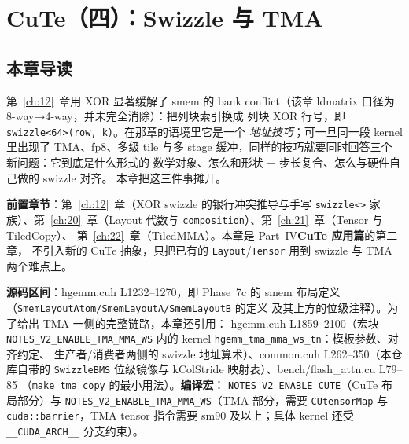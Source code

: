 \makeatletter
\providecommand{\urlchbrk}[1]{\@tfor\next:=#1\do{\next\allowbreak}}
\makeatother
\providecommand{\url}[1]{{\ttfamily\urlchbrk{#1}}}
\chapter{CuTe（四）：Swizzle 与 TMA}\label{ch:23}

\section{本章导读}

第~\ref{ch:12}~章用 XOR 显著缓解了 smem 的 bank conflict（该章 ldmatrix 口径为 8-way→4-way，并未完全消除）：把列块索引换成
列块 XOR 行号，即 \texttt{swizzle\allowbreak{}<64>\allowbreak{}(row,\allowbreak{} k)}。在那章的语境里它是一个
\emph{地址技巧}；可一旦同一段 kernel 里出现了 TMA、fp8、多级 tile 与多
stage 缓冲，同样的技巧就要同时回答三个新问题：它到底是什么形式的
数学对象、怎么和形状 $+$ 步长复合、怎么与硬件自己做的 swizzle 对齐。
本章把这三件事摊开。

\textbf{前置章节}：第~\ref{ch:12}~章（XOR swizzle 的银行冲突推导与手写
\texttt{swizzle<>} 家族）、第~\ref{ch:20}~章（Layout 代数与
\texttt{composition}）、第~\ref{ch:21}~章（Tensor 与 TiledCopy）、
第~\ref{ch:22}~章（TiledMMA）。本章是 Part~IV\textbf{CuTe 应用篇}的第二章，
不引入新的 CuTe 抽象，只把已有的 \texttt{Layout}/\texttt{Tensor} 用到
swizzle 与 TMA 两个难点上。

\textbf{源码区间}：hgemm.cuh L1232--1270，即 Phase~7c 的 smem 布局定义
（\texttt{Smem\allowbreak{}Layout\allowbreak{}Atom/\allowbreak{}SmemLayoutA/\allowbreak{}SmemLayoutB} 的定义
及其上方的位级注释）。为了给出 TMA 一侧的完整链路，本章还引用：
hgemm.cuh L1859--2100（宏块 \texttt{NOTES\_\allowbreak{}V2\_\allowbreak{}ENABLE\_\allowbreak{}TMA\_\allowbreak{}MMA\_\allowbreak{}WS}
内的 kernel \texttt{hgemm\_\allowbreak{}tma\_\allowbreak{}mma\_\allowbreak{}ws\_\allowbreak{}tn}：模板参数、对齐约定、
生产者/消费者两侧的 swizzle 地址算术）、common.cuh L262--350（本仓库自带的
\texttt{SwizzleBMS} 位级镜像与 kColStride 映射表）、bench/flash\_attn.cu L79--85
（\texttt{make\_\allowbreak{}tma\_\allowbreak{}copy} 的最小用法）。\textbf{编译宏}：
\texttt{NOTES\_\allowbreak{}V2\_\allowbreak{}ENABLE\_\allowbreak{}CUTE}（CuTe 布局部分）与
\texttt{NOTES\_\allowbreak{}V2\_\allowbreak{}ENABLE\_\allowbreak{}TMA\_\allowbreak{}MMA\_\allowbreak{}WS}（TMA 部分，需要
\texttt{CUtensorMap} 与 \texttt{cuda::\allowbreak{}barrier}，TMA tensor 指令需要
sm90 及以上；具体 kernel 还受 \texttt{\_\_CUDA\_ARCH\_\_} 分支约束）。

